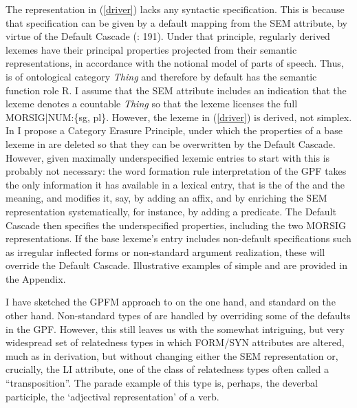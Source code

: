 \documentclass[output=paper,
modfonts
]{LSP/langsci}
\begin{document}
The representation in (\ref{driver}) lacks any syntactic specification. This is because that specification can be given by a default mapping from the SEM attribute, by virtue of the Default Cascade (\citealt{Spencer13:book}: 191). Under that principle,  regularly derived lexemes have their principal  properties projected from their semantic representations, in accordance with the notional model of parts of speech. Thus,  is of ontological category \emph{Thing} and therefore by default has the semantic function role R. I assume that the SEM attribute includes an indication that the lexeme denotes a countable \emph{Thing} so that the lexeme licenses the full MORSIG|NUM:\{sg, pl\}. However, the lexeme in (\ref{driver}) is derived, not simplex. In \citet{Spencer13:book} I propose a Category Erasure Principle, under which the  properties of a base lexeme in  are deleted so that they can be overwritten by the Default Cascade. However, given maximally underspecified lexemic entries to start with this is probably not necessary: the word formation rule interpretation of the GPF takes the only information it has available in a lexical entry, that is the  of the  and the meaning, and modifies it, say, by adding an affix, and by enriching the SEM representation systematically, for instance, by adding a predicate. The Default Cascade then specifies the underspecified properties, including the two MORSIG representations. If the base lexeme’s entry includes non-default specifications such as irregular inflected forms or non-standard argument realization, these will override the Default Cascade. Illustrative examples of simple  and  are provided in the Appendix.

\largerpage[-1]
I have sketched the GPFM approach to  on the one hand, and standard  on the other hand. Non-standard types of  are handled by overriding some of the defaults in the GPF. However, this still  leaves us with the somewhat intriguing, but very widespread set of relatedness types in which FORM/SYN attributes are altered, much as in derivation, but without changing either the SEM representation or, crucially, the LI attribute, one of the class of relatedness types often called a ``transposition''. The parade example of this type is, perhaps, the deverbal participle, the ‘adjectival representation’ of a verb.
 
\end{document}
